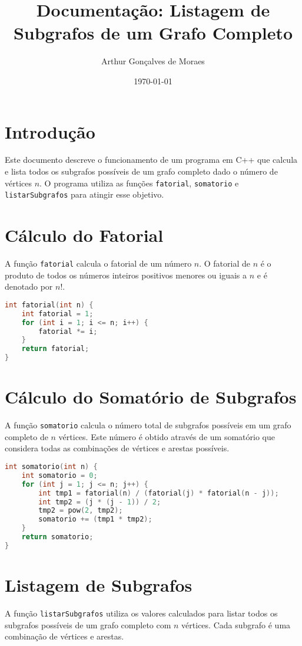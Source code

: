 \documentclass[a4paper,12pt]{article}
\title{Documentação: Listagem de Subgrafos de um Grafo Completo}
\author{Arthur Gonçalves de Moraes}
\date{\today}
\begin{document}
\maketitle

\section{Introdução}
Este documento descreve o funcionamento de um programa em C++ que calcula e lista todos os subgrafos possíveis de um grafo completo dado o número de vértices \(n\). O programa utiliza as funções \texttt{fatorial}, \texttt{somatorio} e \texttt{listarSubgrafos} para atingir esse objetivo.

\section{Cálculo do Fatorial}
A função \texttt{fatorial} calcula o fatorial de um número \(n\). O fatorial de \(n\) é o produto de todos os números inteiros positivos menores ou iguais a \(n\) e é denotado por \(n!\).

\begin{lstlisting}[language=C++]
int fatorial(int n) {
    int fatorial = 1;
    for (int i = 1; i <= n; i++) {
        fatorial *= i;
    }
    return fatorial;
}
\end{lstlisting}

\section{Cálculo do Somatório de Subgrafos}
A função \texttt{somatorio} calcula o número total de subgrafos possíveis em um grafo completo de \(n\) vértices. Este número é obtido através de um somatório que considera todas as combinações de vértices e arestas possíveis.

\begin{lstlisting}[language=C++]
int somatorio(int n) {
    int somatorio = 0;
    for (int j = 1; j <= n; j++) {
        int tmp1 = fatorial(n) / (fatorial(j) * fatorial(n - j));
        int tmp2 = (j * (j - 1)) / 2;
        tmp2 = pow(2, tmp2);
        somatorio += (tmp1 * tmp2);
    }
    return somatorio;
}
\end{lstlisting}

\section{Listagem de Subgrafos}
A função \texttt{listarSubgrafos} utiliza os valores calculados para listar todos os subgrafos possíveis de um grafo completo com \(n\) vértices. Cada subgrafo é uma combinação de vértices e arestas.
\end{document}
